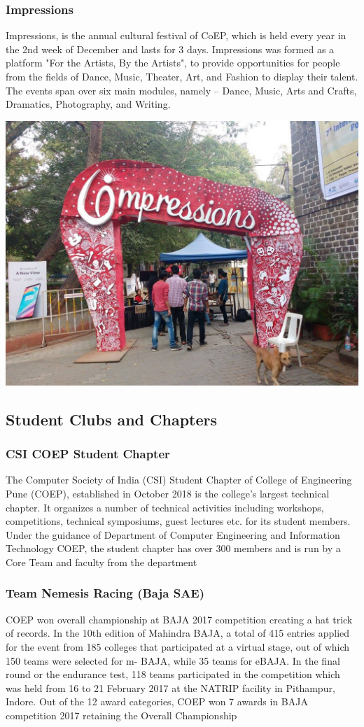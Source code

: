 \documentclass{article}
\begin{document}
\subsubsection{Impressions}
Impressions, is the annual cultural festival of CoEP, which is held every year in the 2nd week of December and lasts for 3 days. Impressions was formed as a platform "For the Artists, By the Artists", to provide opportunities for people from the fields of Dance, Music, Theater, Art, and Fashion to display their talent. The events span over six main modules, namely – Dance, Music, Arts and Crafts, Dramatics, Photography, and Writing.
\begin{center}
  \includegraphics[width=0.5\linewidth]{impressions1.jpg}
  \label{fig:5} 
\end{center}
\subsection{Student Clubs and Chapters}
\subsubsection{CSI COEP Student Chapter}
The Computer Society of India (CSI) Student Chapter of College of Engineering Pune (COEP), established in October 2018 is the college's largest technical chapter. It organizes a number of technical activities including workshops, competitions, technical symposiums, guest lectures etc. for its student members. Under the guidance of Department of Computer Engineering and Information Technology COEP, the student chapter has over 300 members and is run by a Core Team and faculty from the department

\subsubsection{Team Nemesis Racing (Baja SAE)}
COEP won overall championship at BAJA 2017 competition creating a hat trick of records. In the 10th edition of Mahindra BAJA, a total of 415 entries applied for the event from 185 colleges that participated at a virtual stage, out of which 150 teams were selected for m- BAJA, while 35 teams for eBAJA. In the final round or the endurance test, 118 teams participated in the competition which was held from 16 to 21 February 2017 at the NATRIP facility in Pithampur, Indore. Out of the 12 award categories, COEP won 7 awards in BAJA competition 2017 retaining the Overall Championship
\end{document}
